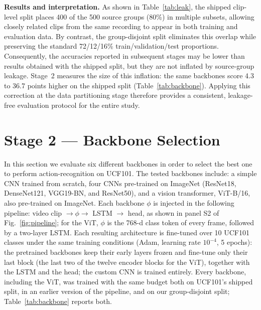 \documentclass[conference]{IEEEtran}
\begin{document}
\textbf{Results and interpretation.} As shown in Table~\ref{tab:leak}, the shipped
clip-level split places 400 of the 500 source groups (80\%) in multiple subsets, allowing
closely related clips from the same recording to appear in both training and evaluation
data. By contrast, the group-disjoint split eliminates this overlap while preserving the
standard 72/12/16\% train/validation/test proportions. Consequently, the accuracies
reported in subsequent stages may be lower than results obtained with the shipped split,
but they are not inflated by source-group leakage. Stage~2 measures the size of this
inflation: the same backbones score 4.3 to 36.7 points higher on the shipped split
(Table~\ref{tab:backbone}). Applying this correction at the data
partitioning stage therefore provides a consistent, leakage-free evaluation protocol for
the entire study.

\section{Stage 2 --- Backbone Selection}
\label{sec:backbone}
In this section we evaluate six different backbones in order to select the best one to perform action-recognition on UCF101.
The tested backbones include: a simple CNN trained from scratch, four CNNs pre-trained on ImageNet (ResNet18, DenseNet121,
VGG19-BN, and ResNet50), and a vision transformer, ViT-B/16, also pre-trained on ImageNet.
Each backbone $\phi$ is injected in the following pipeline: video clip $\to\phi\to$ LSTM $\to$ head, as shown in panel S2 of
Fig.~\ref{fig:pipeline}; for the ViT, $\phi$ is the 768-d class token of every frame, followed by a two-layer LSTM.
Each resulting architecture is fine-tuned over 10 UCF101 classes under the same training conditions (Adam, learning rate
$10^{-4}$, 5 epochs): the pretrained backbones keep their early layers frozen and fine-tune only their last block (the last
two of the twelve encoder blocks for the ViT), together with the LSTM and the head; the custom CNN is trained entirely.
Every backbone, including the ViT, was trained with the same budget both on UCF101's shipped split, in an earlier
version of the pipeline, and on our group-disjoint split; Table~\ref{tab:backbone} reports both.
\end{document}
